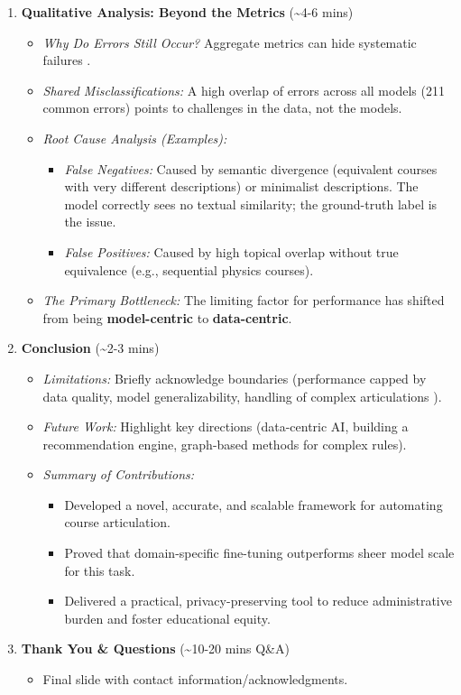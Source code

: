 \documentclass{article}
\begin{document}
\begin{enumerate}
    \item \textbf{Qualitative Analysis: Beyond the Metrics} (\textasciitilde4-6 mins)
    \begin{itemize}
        \item \textit{Why Do Errors Still Occur?} Aggregate metrics can hide systematic failures \cite{gauthier2022}.
        \item \textit{Shared Misclassifications:} A high overlap of errors across all models (211 common errors) points to challenges in the data, not the models.
        \item \textit{Root Cause Analysis (Examples):}
        \begin{itemize}
            \item \textit{False Negatives:} Caused by semantic divergence (equivalent courses with very different descriptions) or minimalist descriptions. The model correctly sees no textual similarity; the ground-truth label is the issue.
            \item \textit{False Positives:} Caused by high topical overlap without true equivalence (e.g., sequential physics courses).
        \end{itemize}
        \item \textit{The Primary Bottleneck:} The limiting factor for performance has shifted from being \textbf{model-centric} to \textbf{data-centric}.
    \end{itemize}

    \item \textbf{Conclusion} (\textasciitilde2-3 mins)
    \begin{itemize}
        \item \textit{Limitations:} Briefly acknowledge boundaries (performance capped by data quality, model generalizability, handling of complex articulations \cite{pardos-articulation-2019}).
        \item \textit{Future Work:} Highlight key directions (data-centric AI, building a recommendation engine, graph-based methods for complex rules).
        \item \textit{Summary of Contributions:}
        \begin{itemize}
            \item Developed a novel, accurate, and scalable framework for automating course articulation.
            \item Proved that domain-specific fine-tuning outperforms sheer model scale for this task.
            \item Delivered a practical, privacy-preserving tool to reduce administrative burden and foster educational equity.
        \end{itemize}
    \end{itemize}
    
    \item \textbf{Thank You \& Questions} (\textasciitilde10-20 mins Q\&A)
    \begin{itemize}
        \item Final slide with contact information/acknowledgments.
    \end{itemize}

\end{enumerate}

\printbibliography
\end{document}
